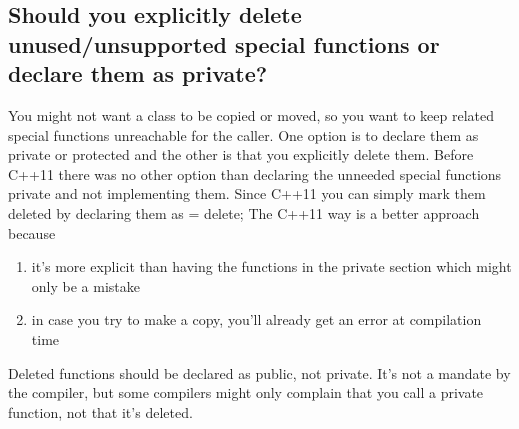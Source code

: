 \documentclass{report}
\begin{document}
\subsection{Should you explicitly delete unused/unsupported special functions or declare them as private?}
\bigbreak \noindent 
You might not want a class to be copied or moved, so you
want to keep related special functions unreachable for the caller.
One option is to declare them as private or protected and the other
is that you explicitly delete them.
\bigbreak \noindent 
Before C++11 there was no other option than declaring the unneeded special functions private and not implementing them.
\bigbreak \noindent 
Since C++11 you can simply mark them deleted by declaring them as = delete;
\bigbreak \noindent 
The C++11 way is a better approach because
\begin{enumerate}
    \item it’s more explicit than having the functions in the private section which might only be a mistake
    \item in case you try to make a copy, you’ll already get an error at compilation time
\end{enumerate}
\bigbreak \noindent 
Deleted functions should be declared as public, not private. It’s not a
mandate by the compiler, but some compilers might only complain
that you call a private function, not that it’s deleted.

\bigbreak \noindent 
\end{document}
